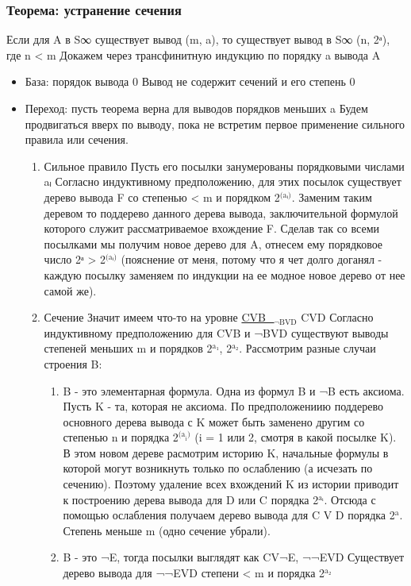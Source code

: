 \documentclass[11pt]{article}
\begin{document}
\subsubsection{Теорема: устранение сечения}
\label{sec-18-4-2}
Если для A в S∞ существует вывод (m, a), то существует
вывод в S∞ (n, 2ᵃ), где n < m
Докажем через трансфинитную индукцию по порядку a вывода A
\begin{itemize}
\item База: порядок вывода 0
Вывод не содержит сечений и его степень 0
\item Переход: пусть теорема верна для выводов порядков меньших a
Будем продвигаться вверх по выводу, пока не встретим первое
применение сильного правила или сечения.
\begin{enumerate}
\item Сильное правило
Пусть его посылки занумерованы порядковыми числами aₗ
Согласно индуктивному предположению, для этих посылок
существует дерево вывода F со степенью < m и порядком 2$^{\text{(aᵢ)}}$.
Заменим таким деревом то поддерево данного дерева вывода,
заключительной формулой которого служит рассматриваемое
вхождение F. Сделав так со всеми посылками мы получим новое
дерево для A, отнесем ему порядковое число 2ᵃ > 2$^{\text{(aᵢ)}}$
(пояснение от меня, потому что я чет долго доганял - каждую
посылку заменяем по индукции на ее модное новое дерево
от нее самой же).
\item Сечение
Значит имеем что-то на уровне
\uline{CVB\_$_{\text{¬BVD}}$}
CVD
Согласно индуктивному предположению для CVB и ¬BVD существуют
выводы степеней меньших m и порядков 2$^{\text{a₁}}$, 2$^{\text{a₂}}$. Рассмотрим
разные случаи строения B:
\begin{enumerate}
\item B - это элементарная формула. Одна из формул B и ¬B есть
аксиома. Пусть K - та, которая не аксиома.
По предположениию поддерево основного дерева вывода с K
может быть заменено другим со степенью n и порядка 2$^{\text{(a}_{\text{i}}\text{)}}$
(i = 1 или 2, смотря в какой посылке K).
В этом новом дереве расмотрим историю K, начальные формулы
в которой могут возникнуть только по ослаблению (а исчезать
по сечению). Поэтому удаление всех вхождений K из истории
приводит к построению дерева вывода для D или C порядка
2$^{\text{aᵢ}}$. Отсюда с помощью ослабления получаем дерево вывода
для C V D порядка 2$^{\text{a}}$. Степень меньше m (одно сечение убрали).
\item B - это ¬E, тогда посылки выглядят как
CV¬E, ¬¬EVD
Существует дерево вывода для ¬¬EVD степени < m и порядка 2$^{\text{a₂}}$

\end{enumerate}
\end{enumerate}
\end{itemize}
\end{document}
